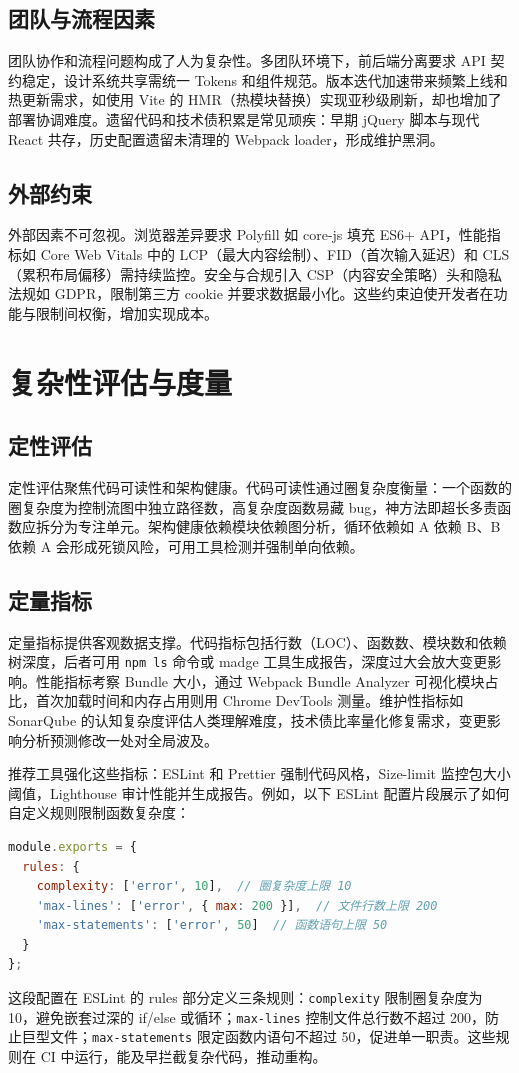 \section{团队与流程因素}
团队协作和流程问题构成了人为复杂性。多团队环境下，前后端分离要求 API 契约稳定，设计系统共享需统一 Tokens 和组件规范。版本迭代加速带来频繁上线和热更新需求，如使用 Vite 的 HMR（热模块替换）实现亚秒级刷新，却也增加了部署协调难度。遗留代码和技术债积累是常见顽疾：早期 jQuery 脚本与现代 React 共存，历史配置遗留未清理的 Webpack loader，形成维护黑洞。\par
\section{外部约束}
外部因素不可忽视。浏览器差异要求 Polyfill 如 core-js 填充 ES6+ API，性能指标如 Core Web Vitals 中的 LCP（最大内容绘制）、FID（首次输入延迟）和 CLS（累积布局偏移）需持续监控。安全与合规引入 CSP（内容安全策略）头和隐私法规如 GDPR，限制第三方 cookie 并要求数据最小化。这些约束迫使开发者在功能与限制间权衡，增加实现成本。\par
\chapter{复杂性评估与度量}
\section{定性评估}
定性评估聚焦代码可读性和架构健康。代码可读性通过圈复杂度衡量：一个函数的圈复杂度为控制流图中独立路径数，高复杂度函数易藏 bug，神方法即超长多责函数应拆分为专注单元。架构健康依赖模块依赖图分析，循环依赖如 A 依赖 B、B 依赖 A 会形成死锁风险，可用工具检测并强制单向依赖。\par
\section{定量指标}
定量指标提供客观数据支撑。代码指标包括行数（LOC）、函数数、模块数和依赖树深度，后者可用 \texttt{npm ls} 命令或 madge 工具生成报告，深度过大会放大变更影响。性能指标考察 Bundle 大小，通过 Webpack Bundle Analyzer 可视化模块占比，首次加载时间和内存占用则用 Chrome DevTools 测量。维护性指标如 SonarQube 的认知复杂度评估人类理解难度，技术债比率量化修复需求，变更影响分析预测修改一处对全局波及。\par
推荐工具强化这些指标：ESLint 和 Prettier 强制代码风格，Size-limit 监控包大小阈值，Lighthouse 审计性能并生成报告。例如，以下 ESLint 配置片段展示了如何自定义规则限制函数复杂度：\par
\begin{lstlisting}[language=javascript]
module.exports = {
  rules: {
    complexity: ['error', 10],  // 圈复杂度上限 10
    'max-lines': ['error', { max: 200 }],  // 文件行数上限 200
    'max-statements': ['error', 50]  // 函数语句上限 50
  }
};
\end{lstlisting}
这段配置在 ESLint 的 rules 部分定义三条规则：\texttt{complexity} 限制圈复杂度为 10，避免嵌套过深的 if/else 或循环；\texttt{max-lines} 控制文件总行数不超过 200，防止巨型文件；\texttt{max-statements} 限定函数内语句不超过 50，促进单一职责。这些规则在 CI 中运行，能及早拦截复杂代码，推动重构。\par
